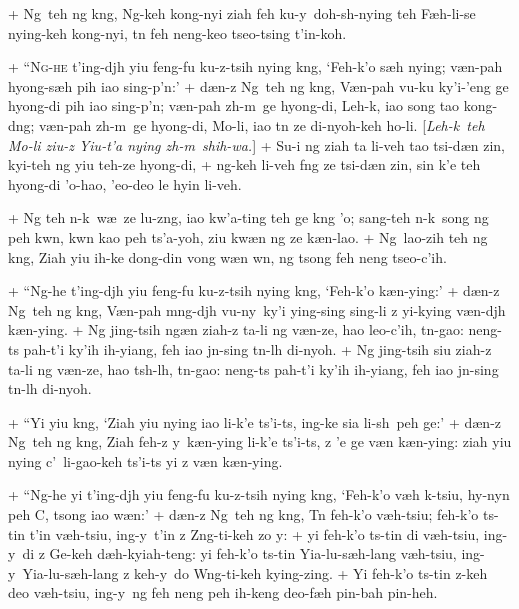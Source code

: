 +	Ng\oo\ teh ng k\oo ng, Ng-keh kong-nyi ziah feh ku-y\y\ doh-sh\y-nying teh F\ae h-li-se nying-keh kong-nyi, t\e n feh neng-keo tseo-tsing t'in-koh.
\par
+	``\textsc{Ng-he} t'ing-dj\oo h yiu feng-fu ku-z-tsih nying k\oo ng, `Feh-k'o s\ae h nying; v\ae n-pah hy\y ong-s\ae h pih iao sing-p'\e n:'
+	d\ae n-z Ng\oo\ teh ng k\oo ng, V\ae n-pah vu-ku ky'i-'eng ge hy\y ong-di pih iao sing-p'\e n; v\ae n-pah z\oo h-m\oo\ ge hy\y ong-di, Leh-k\oo, iao song tao kong-d\oo ng; v\ae n-pah z\oo h-m\oo\ ge hy\y ong-di, Mo-li, iao t\e n ze di-ny\y oh-keh ho-li. [\textit{Leh-k\oo\ teh Mo-li ziu-z Yiu-t'a nying z\oo h-m\oo\ shih-wa.}]
+	Su-i ng ziah ta li-veh tao tsi-d\ae n zin, kyi-teh ng yiu teh-ze hy\y ong-di,
+	ng-keh li-veh f\oo ng ze tsi-d\ae n zin, sin k'e teh hy\y ong-di 'o-hao, 'eo-deo le hyin li-veh.
\par
+	Ng teh \y n-k\oo\ w\ae\ ze lu-z\oo ng, iao kw'a-ting teh ge k\oo ng 'o; sang-teh \y n-k\oo\ song ng peh kw\e n, kw\e n kao peh ts'a-y\y oh, ziu kw\ae n ng ze k\ae n-lao.
+	Ng\oo\ lao-zih teh ng k\oo ng, Ziah yiu ih-ke dong-din vong w\ae n w\e n, ng tsong feh neng tseo-c'ih.
\par
+	``Ng-he t'ing-dj\oo h yiu feng-fu ku-z-tsih nying k\oo ng, `Feh-k'o k\ae n-ying:'
+	d\ae n-z Ng\oo\ teh ng k\oo ng, V\ae n-pah m\oo ng-dj\oo h vu-ny\y\ ky'i ying-sing sing-li z yi-kying v\ae n-dj\oo h k\ae n-ying.
+	Ng jing-tsih ng\ae n ziah-z ta-li ng v\ae n-ze, hao leo-c'ih, t\e n-gao: neng-ts pah-t'i ky'\y ih ih-yiang, feh iao j\y n-sing t\e n-l\oo h di-ny\y oh.
+	Ng jing-tsih siu ziah-z ta-li ng v\ae n-ze, hao ts\oo h-l\oo h, t\e n-gao: neng-ts pah-t'i ky'\y ih ih-yiang, feh iao j\y n-sing t\e n-l\oo h di-ny\y oh.
\par
+	``Yi yiu k\oo ng, `Ziah yiu nying iao li-k'e ts'i-ts, ing-ke sia li-sh\y\ peh ge:'
+	d\ae n-z Ng\oo\ teh ng k\oo ng, Ziah feh-z y\y\ k\ae n-ying li-k'e ts'i-ts, z 'e ge v\ae n k\ae n-ying: ziah yiu nying c'\y\ li-gao-keh ts'i-ts yi z v\ae n k\ae n-ying.
\par
+	``Ng-he yi t'ing-dj\oo h yiu feng-fu ku-z-tsih nying k\oo ng, `Feh-k'o v\ae h k\oo-tsiu, hy\y-ny\y n peh C\y, tsong iao w\ae n:'
+	d\ae n-z Ng\oo\ teh ng k\oo ng, T\e n feh-k'o v\ae h-tsiu; feh-k'o ts-tin t'in v\ae h-tsiu, ing-y\y\ t'in z Z\oo ng-ti-keh zo y\y:
+	yi feh-k'o ts-tin di v\ae h-tsiu, ing-y\y\ di z Ge-keh d\ae h-kyiah-teng: yi feh-k'o ts-tin Yia-lu-s\ae h-lang v\ae h-tsiu, ing-y\y\ Yia-lu-s\ae h-lang z keh-y\y\ do W\oo ng-ti-keh kying-zing.
+	Yi feh-k'o ts-tin z-keh deo v\ae h-tsiu, ing-y\y\ ng feh neng peh ih-keng deo-f\ae h pin-bah pin-heh.
